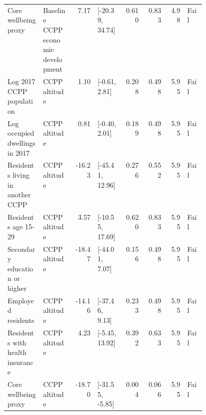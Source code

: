 \begin{longtable}{@{}p{0.18\linewidth}p{0.15\linewidth}rp{0.13\linewidth}rrrl@{}}
Core wellbeing proxy & Baseline CCPP economic development & 7.17 & [-20.39, 34.74] & 0.610 & 0.833 & 4.98 & Fail \\
Log 2017 CCPP population & CCPP altitude & 1.10 & [-0.61, 2.81] & 0.208 & 0.498 & 5.95 & Fail \\
Log occupied dwellings in 2017 & CCPP altitude & 0.81 & [-0.40, 2.01] & 0.189 & 0.498 & 5.95 & Fail \\
Residents living in another CCPP & CCPP altitude & -16.23 & [-45.41, 12.96] & 0.276 & 0.552 & 5.95 & Fail \\
Residents age 15-29 & CCPP altitude & 3.57 & [-10.55, 17.69] & 0.620 & 0.833 & 5.95 & Fail \\
Secondary education or higher & CCPP altitude & -18.47 & [-44.01, 7.07] & 0.156 & 0.498 & 5.95 & Fail \\
Employed residents & CCPP altitude & -14.16 & [-37.46, 9.13] & 0.233 & 0.498 & 5.95 & Fail \\
Residents with health insurance & CCPP altitude & 4.23 & [-5.45, 13.92] & 0.392 & 0.633 & 5.95 & Fail \\
Core wellbeing proxy & CCPP altitude & -18.70 & [-31.55, -5.85] & 0.004 & 0.066 & 5.95 & Fail \\
\end{longtable}
\endgroup
